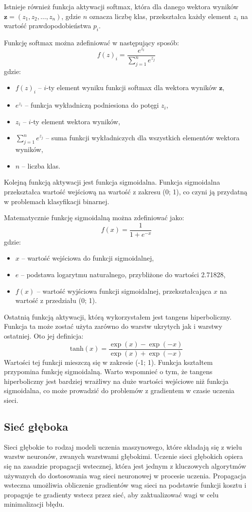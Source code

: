 \documentclass{article}
\begin{document}
Istnieje również funkcja aktywacji softmax, która dla danego wektora wyników \( \mathbf{z} = (z_1, z_2, \ldots, z_n) \), gdzie \( n \) oznacza liczbę klas, przekształca każdy element \( z_i \) na wartość prawdopodobieństwa \( p_i \).

Funkcję softmax można zdefiniować w następujący sposób:
\[
    f(z)_i = \frac{e^{z_i}}{\sum_{j=1}^{n} e^{z_j}}
\]
gdzie:
\begin{itemize}
    \item \(f(z)_i\) -- \(i\)-ty element wyniku funkcji softmax dla wektora wyników \(\mathbf{z}\),
    \item \(e^{z_i}\) -- funkcja wykładniczą podniesiona do potęgi \(z_i\),
    \item \(z_i\) -- \(i\)-ty element wektora wyników,
    \item \(\sum_{j=1}^{n} e^{z_j}\) -- suma funkcji wykładniczych dla wszystkich elementów wektora wyników,
    \item \(n\) -- liczba klas.
\end{itemize}

Kolejną funkcją aktywacji jest funkcja sigmoidalna.
Funkcja sigmoidalna przekształca wartość wejściową na wartość z zakresu (0; 1), co czyni ją przydatną w problemach klasyfikacji binarnej.

Matematycznie funkcję sigmoidalną można zdefiniować jako:
\[
    f(x) = \frac{1}{1 + e^{-x}}
\]
gdzie:
\begin{itemize}
    \item \(x\) -- wartość wejściowa do funkcji sigmoidalnej,
    \item \(e\) --  podstawa logarytmu naturalnego, przybliżone do wartości 2.71828,
    \item \(f(x)\) -- wartość wyjściowa funkcji sigmoidalnej, przekształcająca \(x\) na wartość z przedziału (0; 1).
\end{itemize}

Ostatnią funkcją aktywacji, którą wykorzystałem jest tangens hiperboliczny.
Funkcja ta może zostać użyta zarówno do warstw ukrytych jak i warstwy ostatniej.
Oto jej definicja:
\[\text{tanh}(x) = \frac{{\exp(x) - \exp(-x)}}{{\exp(x) + \exp(-x)}}\]
Wartości tej funkcji mieszczą się w zakresie (-1; 1).
Funkcja kształtem przypomina funkcję sigmoidalną.
Warto wspomnieć o tym, że tangens hiperboliczny jest bardziej wrażliwy na duże wartości wejściowe niż funkcja sigmoidalna, co może prowadzić do problemów z gradientem w czasie uczenia sieci.

\newpage
\subsection{Sieć głęboka}
Sieci głębokie to rodzaj modeli uczenia maszynowego, które składają się z wielu warstw neuronów, zwanych warstwami głębokimi.
Uczenie sieci głębokich opiera się na zasadzie propagacji wstecznej, która jest jednym z kluczowych algorytmów używanych do dostosowania wag sieci neuronowej w procesie uczenia.
Propagacja wsteczna umożliwia obliczenie gradientów wag sieci na podstawie funkcji kosztu i propaguje te gradienty wstecz przez sieć, aby zaktualizować wagi w celu minimalizacji błędu.
\end{document}
